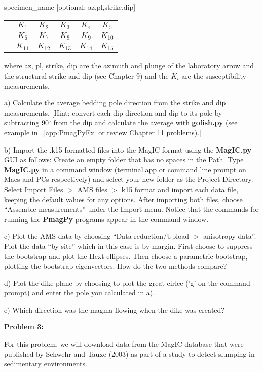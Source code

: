 {{\parskip 0pt
specimen\_name [optional: az,pl,strike,dip]

\begin{tabular}{cccccc}
 & $K_1$&$K_2$&$K_3$&$K_4$&$K_5$\\
  & $K_6$&$K_7$&$K_8$&$K_9$&$K_{10}$\\
   & $K_{11}$&$K_{12}$&$K_{13}$&$K_{14}$&$K_{15}$\\
\end{tabular}}

\noindent where az, pl, strike, dip are the azimuth and plunge of the laboratory arrow and the structural strike and dip (see Chapter 9) and the $K_i$ are the susceptibility measurements.  

a) Calculate the average bedding pole direction from the strike and dip measurements.  [Hint:  convert each dip direction and dip to its pole by subtracting 90$^{\circ}$ from the dip and calculate the average with {\bf gofish.py} (see example in ~\ref{app:PmagPyEx} or review Chapter 11 problems).]  

b)  Import the .k15 formatted files into the MagIC format using the {\bf MagIC.py} GUI as follows:  Create an empty folder that has no spaces in the Path.   Type {\bf MagIC.py} in a command window (terminal.app or command line prompt on Macs and PCs respectively) and select your new folder as the Project Directory.    Select Import Files $>$ AMS files $>$ k15 format and import each data file, keeping the default values for any options.  After importing both files, choose ``Assemble measurements'' under the Import menu.   Notice that the commands for running the {\bf PmagPy} programs appear in the command window.   

c)   Plot the AMS data by choosing ``Data reduction/Upload $>$ anisotropy data''.  Plot the data ``by site'' which in this case is by margin.  First choose to suppress the bootstrap and plot the Hext ellipses.  Then choose a parametric bootstrap, plotting the bootstrap eigenvectors.     How do the two methods compare?   


d) Plot the dike plane by choosing to plot the great cirlce ('g' on the command prompt) and enter the pole you calculated in a).   

e) Which direction was the magma flowing when the dike was created?  

{\bf Problem 3:}

For this problem, we will download data from the MagIC database that were published by Schwehr and Tauxe (2003) as part of a study to detect slumping in sedimentary environments.   
\nocite{schwehr03}

}

